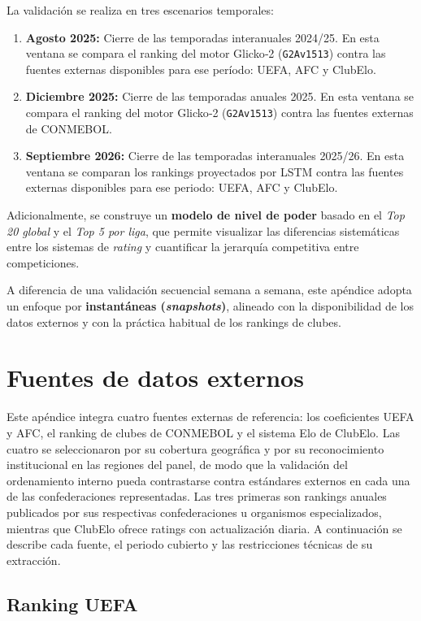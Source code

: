 La validaci\'on se realiza en tres escenarios temporales:
\begin{enumerate}
	\item \textbf{Agosto 2025:} Cierre de las temporadas interanuales 2024/25. En esta ventana se compara el ranking del motor Glicko‑2 (\texttt{G2Av1513}) contra las fuentes externas disponibles para ese per\'iodo: UEFA, AFC y ClubElo.
	\item \textbf{Diciembre 2025:} Cierre de las temporadas anuales 2025. En esta ventana se compara el ranking del motor Glicko‑2 (\texttt{G2Av1513}) contra las fuentes externas de CONMEBOL.
	\item \textbf{Septiembre 2026:} Cierre de las temporadas interanuales 2025/26. En esta ventana se comparan los rankings proyectados por LSTM contra las fuentes externas disponibles para ese periodo: UEFA, AFC y ClubElo.
\end{enumerate}

Adicionalmente, se construye un \textbf{modelo de nivel de poder} basado en el \textit{Top 20 global} y el \textit{Top 5 por liga}, que permite visualizar las diferencias sistem\'aticas entre los sistemas de \textit{rating} y cuantificar la jerarqu\'ia competitiva entre competiciones.

A diferencia de una validaci\'on secuencial semana a semana, este ap\'endice adopta un enfoque por \textbf{instant\'aneas (\textit{snapshots})}, alineado con la disponibilidad de los datos externos y con la pr\'actica habitual de los rankings de clubes.

\section{Fuentes de datos externos}

Este ap\'endice integra cuatro fuentes externas de referencia: los coeficientes UEFA y AFC, el ranking de clubes de CONMEBOL y el sistema Elo de ClubElo. Las cuatro se seleccionaron por su cobertura geogr\'afica y por su reconocimiento institucional en las regiones del panel, de modo que la validaci\'on del ordenamiento interno pueda contrastarse contra est\'andares externos en cada una de las confederaciones representadas. Las tres primeras son rankings anuales publicados por sus respectivas confederaciones u organismos especializados, mientras que ClubElo ofrece ratings con actualizaci\'on diaria. A continuaci\'on se describe cada fuente, el periodo cubierto y las restricciones t\'ecnicas de su extracci\'on.

\subsection{Ranking UEFA}

